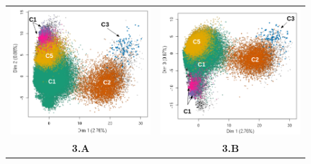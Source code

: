 \documentclass[12pt,a4paper]{article}
\begin{document}
\begin{figure}
\begin{tabular}{cc}
		\includegraphics[scale=0.4]{img/pogonias_acp1.png} &  \includegraphics[scale=0.4]{img/pogonias_acp2.png} \\
		\textbf{3.A} & \textbf{3.B} \\

\end{tabular}
\end{figure}
\end{document}

